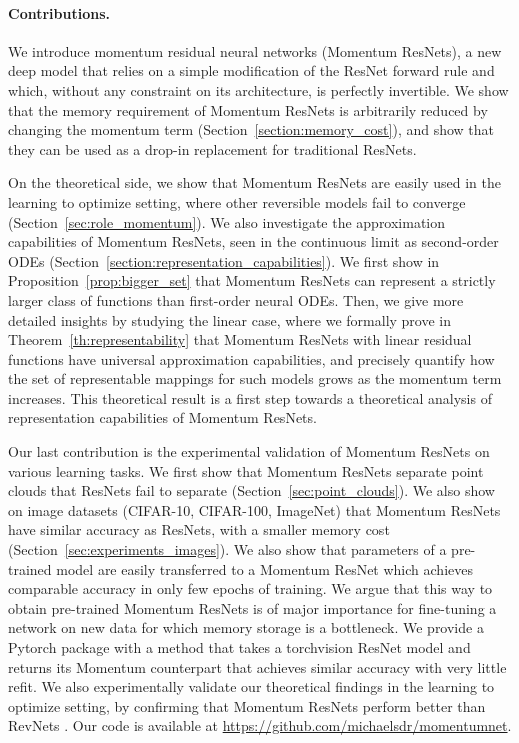 \documentclass{article}
\begin{document}
\paragraph{Contributions.}

We  introduce momentum residual neural networks (Momentum ResNets), a new deep model that relies on a simple modification of the ResNet forward rule and which, without any constraint on its architecture, is perfectly invertible. We show that the memory requirement of Momentum ResNets is arbitrarily reduced by changing the momentum term  (Section~\ref{section:memory_cost}), and show that they can be used as a drop-in replacement for traditional ResNets.

On the theoretical side,  we show that Momentum ResNets are easily used in the learning to optimize setting, where other reversible models fail to converge (Section~\ref{sec:role_momentum}). We also investigate the approximation capabilities of Momentum ResNets, seen in the continuous limit as second-order ODEs (Section~\ref{section:representation_capabilities}). We first show in Proposition~\ref{prop:bigger_set} that Momentum ResNets can represent a strictly larger class of functions than first-order neural ODEs. Then, we give more detailed insights by studying the linear case, where we formally prove in Theorem~\ref{th:representability} that Momentum ResNets with linear residual functions have universal approximation capabilities, and precisely quantify how the set of representable mappings for such models grows as the momentum term  increases. This theoretical result is a first step towards a theoretical analysis of representation capabilities of Momentum ResNets.
 
 Our last contribution is the experimental validation of Momentum ResNets on various learning tasks. We first show that Momentum ResNets separate point clouds that ResNets fail to separate (Section~\ref{sec:point_clouds}). We also show on image datasets (CIFAR-10, CIFAR-100, ImageNet) that Momentum ResNets have similar accuracy as ResNets, with a smaller memory cost (Section~\ref{sec:experiments_images}). We also show that parameters of a pre-trained model are easily transferred to a Momentum ResNet which achieves comparable accuracy in only few epochs of training. We argue that this way to obtain pre-trained Momentum ResNets is of major importance for fine-tuning a network on new data for which memory storage is a bottleneck.  We provide a Pytorch package with a method that takes a torchvision ResNet model and returns its Momentum counterpart that achieves similar accuracy with very little refit.  We also experimentally validate our theoretical findings in the learning to optimize setting, by confirming that Momentum ResNets perform better than RevNets \citep{gomez2017reversible}. 
 Our code is available at \url{https://github.com/michaelsdr/momentumnet}.
\end{document}
